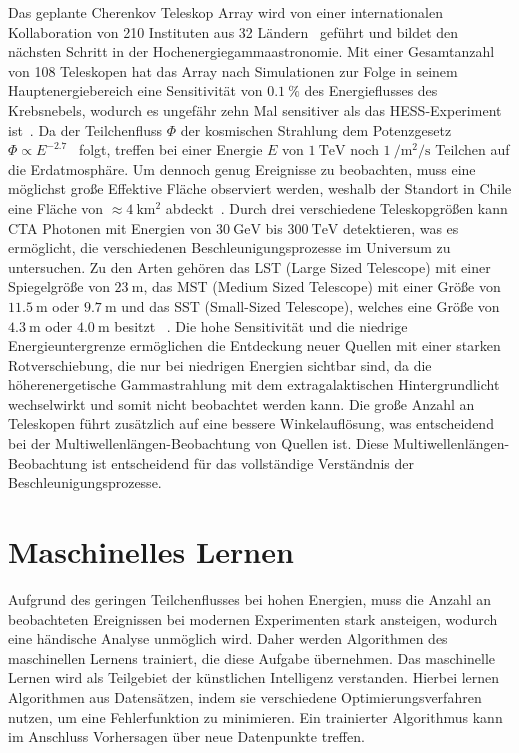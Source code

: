 Das geplante Cherenkov Teleskop Array wird von einer internationalen Kollaboration von 210 Instituten aus 32 Ländern~\cite{CTA_consortium} geführt
und bildet den nächsten Schritt in der Hochenergiegammaastronomie.
Mit einer Gesamtanzahl von 108 Teleskopen hat das Array nach Simulationen zur Folge in seinem Hauptenergiebereich eine Sensitivität von $\SI{0.1}{\percent}$
des Energieflusses des Krebsnebels, wodurch es ungefähr zehn Mal sensitiver als das HESS-Experiment ist~\cite{CTA_paper}.
Da der Teilchenfluss $\Phi$ der kosmischen Strahlung dem Potenzgesetz $\Phi \propto E^{-2.7}$~\cite[5]{Cosmic_rays} folgt,
treffen bei einer Energie $E$ von $\SI{1}{\tera\eV}$ noch $\SI{1}{\per\m\squared\per\s}$ Teilchen auf die Erdatmosphäre.
Um dennoch genug Ereignisse zu beobachten, muss eine möglichst große Effektive Fläche observiert werden, weshalb der Standort in
Chile eine Fläche von $\approx \SI{4}{\kilo\m\squared}$ abdeckt~\cite{CTA_ob}.
Durch drei verschiedene Teleskopgrößen kann CTA Photonen mit Energien von $\SI{30}{\giga\eV}$ bis $\SI{300}{\tera\eV}$ detektieren,
was es ermöglicht, die verschiedenen Beschleunigungsprozesse im Universum zu untersuchen.
Zu den Arten gehören das LST (Large Sized Telescope) mit einer Spiegelgröße von $\SI{23}{\m}$, das MST (Medium Sized Telescope)
mit einer Größe von $\SI{11.5}{\m}$ oder $\SI{9.7}{\m}$ und das SST (Small-Sized Telescope), welches eine Größe von $\SI{4.3}{\m}$ oder $\SI{4.0}{\m}$
besitzt~\cite{CTA_tec} .
Die hohe Sensitivität und die niedrige Energieuntergrenze ermöglichen die Entdeckung neuer Quellen mit einer starken Rotverschiebung, die nur bei niedrigen
Energien sichtbar sind, da die höherenergetische Gammastrahlung mit dem extragalaktischen Hintergrundlicht wechselwirkt und somit nicht beobachtet werden kann.
Die große Anzahl an Teleskopen führt zusätzlich auf eine bessere Winkelauflösung, was entscheidend bei der Multiwellenlängen-Beobachtung von Quellen ist.
Diese Multiwellenlängen-Beobachtung ist entscheidend für das vollständige Verständnis der Beschleunigungsprozesse.

\section{Maschinelles Lernen}
\label{sec:ML}

Aufgrund des geringen Teilchenflusses bei hohen Energien, muss die Anzahl an beobachteten Ereignissen bei modernen
Experimenten stark ansteigen, wodurch eine händische Analyse unmöglich wird.
Daher werden Algorithmen des maschinellen Lernens trainiert, die diese Aufgabe übernehmen.
Das maschinelle Lernen wird als Teilgebiet der künstlichen Intelligenz verstanden. Hierbei lernen Algorithmen aus Datensätzen,
indem sie verschiedene Optimierungsverfahren nutzen, um eine Fehlerfunktion zu minimieren.
Ein trainierter Algorithmus kann im Anschluss Vorhersagen über neue Datenpunkte treffen.

